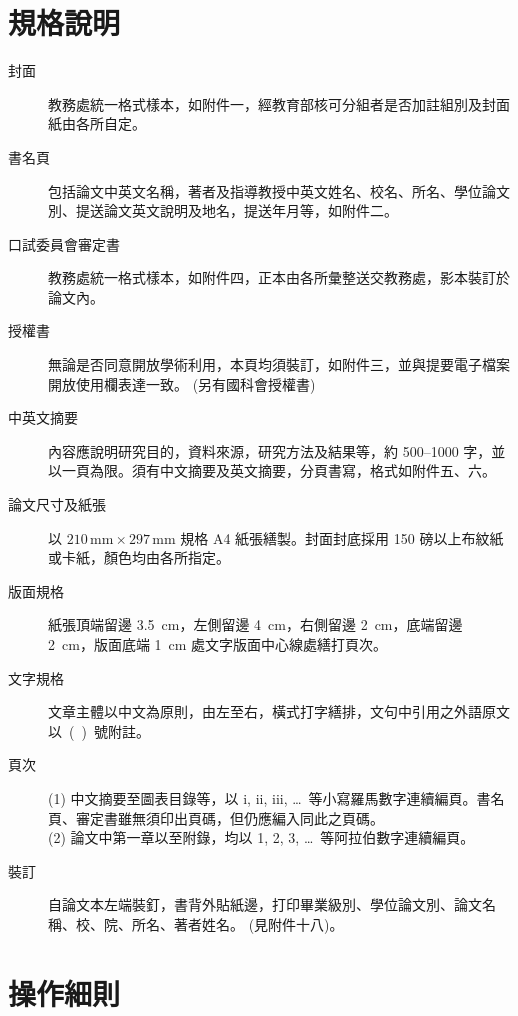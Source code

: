 \section{規格說明}
\begin{description}
\item[封面]  教務處統一格式樣本，如附件一，經教育部核可分組者是否加註組別及封面紙由各所自定。
\item[書名頁] 包括論文中英文名稱，著者及指導教授中英文姓名、校名、所名、學位論文別、提送論文英文說明及地名，提送年月等，如附件二。
\item[口試委員會審定書] 教務處統一格式樣本，如附件四，正本由各所彙整送交教務處，影本裝訂於論文內。
\item[授權書] 無論是否同意開放學術利用，本頁均須裝訂，如附件三，並與提要電子檔案開放使用欄表達一致。 (另有國科會授權書) 
\item[中英文摘要] 內容應說明研究目的，資料來源，研究方法及結果等，約 500--1000 字，並以一頁為限。須有中文摘要及英文摘要，分頁書寫，格式如附件五、六。
\item[論文尺寸及紙張] 以 $210\,\mathrm{mm} \times 297\,\mathrm{mm}$ 規格 A4 紙張繕製。封面封底採用 150 磅以上布紋紙或卡紙，顏色均由各所指定。
\item[版面規格] 紙張頂端留邊 3.5~cm，左側留邊 4~cm，右側留邊 2~cm，底端留邊 2~cm，版面底端 1~cm 處文字版面中心線處繕打頁次。
\item[文字規格] 文章主體以中文為原則，由左至右，橫式打字繕排，文句中引用之外語原文以~(~)~號附註。
\item[頁次] (1) 中文摘要至圖表目錄等，以 i, ii, iii, \ldots\ 等小寫羅馬數字連續編頁。書名頁、審定書雖無須印出頁碼，但仍應編入同此之頁碼。\\
(2) 論文中第一章以至附錄，均以 1, 2, 3, \ldots\ 等阿拉伯數字連續編頁。
\item[裝訂] 自論文本左端裝釘，書背外貼紙邊，打印畢業級別、學位論文別、論文名稱、校、院、所名、著者姓名。 (見附件十八)。
\end{description}

\section{操作細則}

